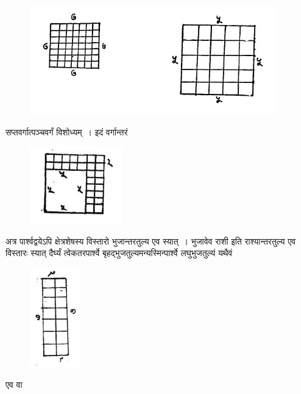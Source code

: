 \documentclass[11pt, openany]{book}
\begin{document}
\begin{figure}[h!]
    \centering
    \includegraphics[scale=0.8]{graphics/Capture16.png}
\end{figure}
\newpage
\noindent सप्तवर्गात्पञ्चवर्गं विशोध्यम्~। इदं वर्गान्तरं 
\vspace{-2mm}

\begin{figure}[h!]
    \centering
    \includegraphics[scale=0.6]{graphics/Capture2.png}
\end{figure}
\vspace{-2mm}

\noindent अत्र पार्श्वद्वयेऽपि क्षेत्रशेषस्य विस्तारो भुजान्तरतुल्य एव स्यात्~।
भुजावेव राशी इति राश्यान्तरतुल्य एव विस्तारः स्यात् दैर्घ्यं त्वेकतरपार्श्वे
बृहद्भुजतुल्यमन्यस्मिन्पार्श्वे लघुभुजतुल्यं यथैवं 
\vspace{-2mm}

\begin{figure}[h!]
    \centering
    \includegraphics[scale=0.7]{graphics/Capture3.png}
\end{figure}
\vspace{-2mm}

\noindent एव वा 
\vspace{-2mm}
\end{document}
